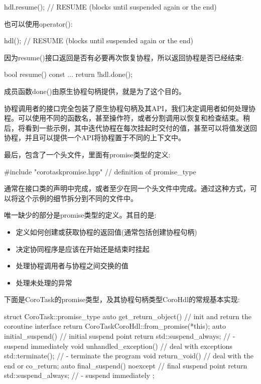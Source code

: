 \begin{cpp}
hdl.resume(); // RESUME (blocks until suspended again or the end)
\end{cpp}

也可以使用operator():

\begin{cpp}
hdl(); // RESUME (blocks until suspended again or the end)
\end{cpp}

因为resume()接口返回是否有必要再次恢复协程，所以返回协程是否已经结束:

\begin{cpp}
bool resume() const {
	...
	return !hdl.done();
}
\end{cpp}

成员函数done()由原生协程句柄提供，就是为了这个目的。

协程调用者的接口完全包装了原生协程句柄及其API，我们决定调用者如何处理协程。可以使用不同的函数名，甚至操作符，或者分割调用以恢复和检查结束。稍后，将看到一些示例，其中迭代协程在每次挂起时交付的值，甚至可以将值发送回协程，并且可以提供一个API将协程置于不同的上下文中。

最后，包含了一个头文件，里面有promise类型的定义:

\begin{cpp}
#include "corotaskpromise.hpp" // definition of promise_type
\end{cpp}

通常在接口类的声明中完成，或者至少在同一个头文件中完成。通过这种方式，可以将这个示例的细节拆分到不同的文件中。


唯一缺少的部分是promise类型的定义。其目的是:

\begin{itemize}
\item
定义如何创建或获取协程的返回值(通常包括创建协程句柄)

\item
决定协同程序是应该在开始还是结束时挂起

\item
处理协程调用者与协程之间交换的值

\item
处理未处理的异常
\end{itemize}

下面是CoroTask的promise类型，及其协程句柄类型CoroHdl的常规基本实现:


\begin{cpp}
struct CoroTask::promise_type {
	auto get_return_object() { // init and return the coroutine interface
		return CoroTask{CoroHdl::from_promise(*this)};
	}
	auto initial_suspend() { // initial suspend point
		return std::suspend_always{}; // - suspend immediately
	}
	void unhandled_exception() { // deal with exceptions
		std::terminate(); // - terminate the program
	}
	void return_void() { // deal with the end or co_return;
	}
	auto final_suspend() noexcept { // final suspend point
		return std::suspend_always{}; // - suspend immediately
	}
};
\end{cpp}

